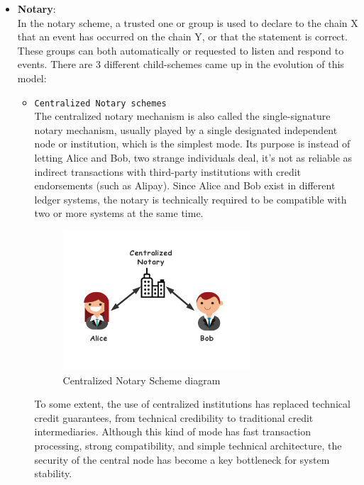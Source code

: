 \begin{itemize}
    \item \textbf{Notary\cite{buterin2016chain}}:\\
    In the notary scheme, a trusted one or group is used to declare to the chain X that an event has occurred on the chain Y, or that the statement is correct. These groups can both automatically or requested to listen and respond to events. There are 3 different child-schemes came up in the evolution of this model: 
    \begin{itemize}
        \item \texttt{Centralized Notary schemes}\\
        The centralized notary mechanism is also called the single-signature notary mechanism, usually played by a single designated independent node or institution, which is the simplest mode. Its purpose is instead of letting Alice and Bob, two strange individuals deal, it's not as reliable as indirect transactions with third-party institutions with credit endorsements (such as Alipay). Since Alice and Bob exist in different ledger systems, the notary is technically required to be compatible with two or more systems at the same time.
        \begin{figure}[H]
        \includegraphics[width=0.7\textwidth]{./figures/cnotary.png}
        \centering
        \caption{Centralized Notary Scheme diagram}%
        \centering
        \label{fig:cno}
        \end{figure}
        To some extent, the use of centralized institutions has replaced technical credit guarantees, from technical credibility to traditional credit intermediaries. Although this kind of mode has fast transaction processing, strong compatibility, and simple technical architecture, the security of the central node has become a key bottleneck for system stability.
        

\end{itemize}
\end{itemize}
